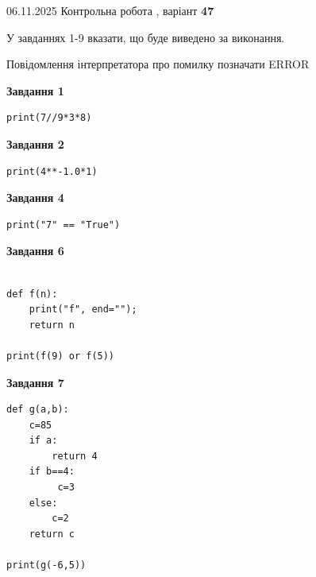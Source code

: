 \documentclass[12pt, ukrainian]{article}
\begin{document}
{\Large{06.11.2025 Контрольна робота , варіант  \No \textbf { 47 }\par}}
{
\begin {large}
У завданнях 1-9 вказати, що буде виведено за виконання.

Повідомлення інтерпретатора про помилку позначати ERROR

\begin{minipage}[t]{7.5cm}

\begin{center}
\textbf{Завдання 1}
\end{center}

\begin{verbatim}
print(7//9*3*8)
\end{verbatim}



\begin{center}
\textbf{Завдання 2}
\end{center}

\begin{verbatim}
print(4**-1.0*1)
\end{verbatim}



\begin{center}
\textbf{Завдання 4}
\end{center}

\begin{verbatim}
print("7" == "True")
\end{verbatim}



\begin{center}
\textbf{Завдання 6}
\end{center}

\begin{verbatim}

def f(n):
    print("f", end="");
    return n

print(f(9) or f(5))
\end{verbatim}



\begin{center}
\textbf{Завдання 7}
\end{center}

\begin{verbatim}
def g(a,b):
    c=85
    if a:
        return 4
    if b==4:
         c=3
    else: 
        c=2
    return c

print(g(-6,5))
\end{verbatim}


\end{minipage}
\end{large}}
\end{document}
